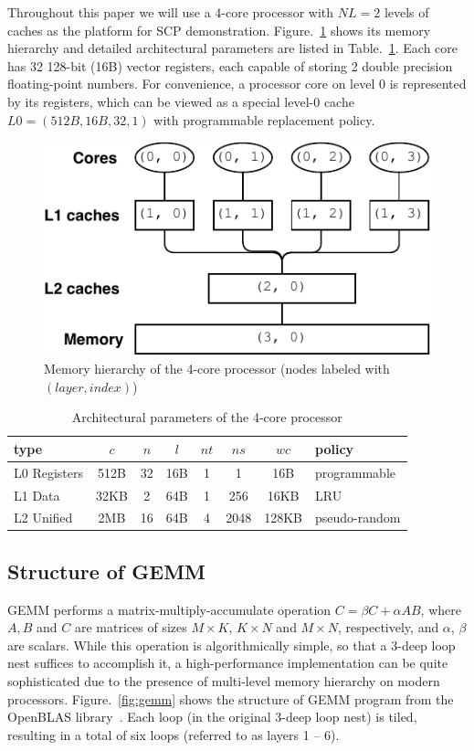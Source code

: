 Throughout this paper we will use a 4-core processor with
$NL=2$ levels of caches as the platform for SCP demonstration.
Figure.~\ref{fig:hierachy} shows its memory hierarchy and
detailed architectural parameters are listed in Table.~\ref{tab:cluster}.
Each core has 32 128-bit (16B) vector registers,
each capable of storing 2 double precision floating-point numbers.
For convenience, a processor core on level 0
is represented by its registers, which can be viewed as a special
level-0 cache $L0 = (512B, 16B, 32, 1)$ with programmable replacement policy.

\begin{figure}
  \centering
  \includegraphics[width=.45\textwidth]{figures/cluster-new}
  \caption{Memory hierarchy of the 4-core processor
    (nodes labeled with $(layer,index)$)}
  \label{fig:hierachy}
\end{figure}

\begin{table}
  \centering
  \caption{Architectural parameters of the 4-core processor}
  \label{tab:cluster}
  \begin{tabular}{lccccccl}
    \toprule
    type & $c$ & $n$ & $l$ & $nt$ & $ns$ & $wc$ & policy \\
    \midrule
    L0 Registers  & 512B & 32 & 16B & 1 & 1 & 16B & programmable \\
    L1 Data    & 32KB & 2  & 64B & 1 & 256 & 16KB & LRU \\
    L2 Unified & 2MB  & 16 & 64B & 4 & 2048 & 128KB & pseudo-random \\
    \bottomrule
  \end{tabular}
\end{table}

\subsection{Structure of GEMM}\label{subsec:gemm}

GEMM performs a matrix-multiply-accumulate operation $C = \beta C + \alpha A B$,
where $A, B$ and $C$ are matrices of sizes
$M \times K$, $K \times N$ and $M \times N$, respectively,
and $\alpha$, $\beta$ are scalars.
While this operation is algorithmically simple,
so that a 3-deep loop nest suffices to accomplish it,
a high-performance implementation can be quite
sophisticated due to the presence of multi-level memory
hierarchy on modern processors.
Figure.~\ref{fig:gemm} shows the structure of GEMM program from
the OpenBLAS library~\cite{openblas}.
Each loop (in the original 3-deep loop nest) is tiled,
resulting in a total of six loops (referred to as layers 1 -- 6).

